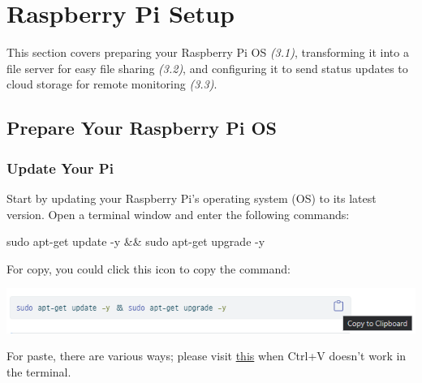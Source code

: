 \documentclass[
  letterpaper,
]{scrbook}
\newenvironment{Shaded}{\begin{snugshade}}{\end{snugshade}}
\newcommand{\AttributeTok}[1]{\textcolor[rgb]{0.40,0.45,0.13}{#1}}
\newcommand{\FunctionTok}[1]{\textcolor[rgb]{0.28,0.35,0.67}{#1}}
\newcommand{\KeywordTok}[1]{\textcolor[rgb]{0.00,0.23,0.31}{#1}}
\newcommand{\NormalTok}[1]{\textcolor[rgb]{0.00,0.23,0.31}{#1}}
\begin{document}
\hypertarget{raspberry-pi-setup}{%
\chapter{Raspberry Pi Setup}\label{raspberry-pi-setup}}

This section covers preparing your Raspberry Pi OS \emph{(3.1)},
transforming it into a file server for easy file sharing \emph{(3.2)},
and configuring it to send status updates to cloud storage for remote
monitoring \emph{(3.3)}.

\hypertarget{prepare-your-raspberry-pi-os}{%
\section{Prepare Your Raspberry Pi
OS}\label{prepare-your-raspberry-pi-os}}

\hypertarget{update-your-pi}{%
\subsection{Update Your Pi}\label{update-your-pi}}

Start by updating your Raspberry Pi's operating system (OS) to its
latest version. Open a terminal window and enter the following commands:

\begin{Shaded}
\begin{Highlighting}[]
\FunctionTok{sudo}\NormalTok{ apt{-}get update }\AttributeTok{{-}y} \KeywordTok{\&\&} \FunctionTok{sudo}\NormalTok{ apt{-}get upgrade }\AttributeTok{{-}y}
\end{Highlighting}
\end{Shaded}

\begin{tcolorbox}[enhanced jigsaw, left=2mm, coltitle=black, colframe=quarto-callout-note-color-frame, bottomrule=.15mm, colback=white, bottomtitle=1mm, breakable, colbacktitle=quarto-callout-note-color!10!white, titlerule=0mm, toptitle=1mm, arc=.35mm, rightrule=.15mm, opacityback=0, title=\textcolor{quarto-callout-note-color}{\faInfo}\hspace{0.5em}{How to copy/paste in Linux terminal}, toprule=.15mm, leftrule=.75mm, opacitybacktitle=0.6]

For copy, you could click this icon to copy the command:

\includegraphics{content/material/ch2/ex_copy.png}

For paste, there are various ways; please visit
\href{https://www.maketecheasier.com/enable-copy-paste-command-prompt-windows10/}{this}
when Ctrl+V doesn't work in the terminal.

\end{tcolorbox}
\end{document}
